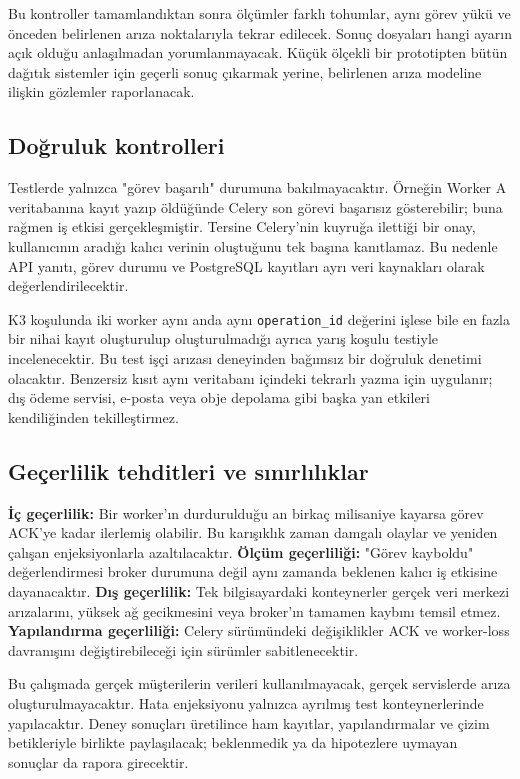 \documentclass[conference,a4paper]{IEEEtran}
\newcommand{\code}[1]{\texttt{#1}}
\begin{document}
Bu kontroller tamamlandıktan sonra ölçümler farklı tohumlar, aynı görev yükü ve önceden belirlenen arıza noktalarıyla tekrar edilecek. Sonuç dosyaları hangi ayarın açık olduğu anlaşılmadan yorumlanmayacak. Küçük ölçekli bir prototipten bütün dağıtık sistemler için geçerli sonuç çıkarmak yerine, belirlenen arıza modeline ilişkin gözlemler raporlanacak.

\subsection{Doğruluk kontrolleri}
Testlerde yalnızca "görev başarılı" durumuna bakılmayacaktır. Örneğin Worker A veritabanına kayıt yazıp öldüğünde Celery son görevi başarısız gösterebilir; buna rağmen iş etkisi gerçekleşmiştir. Tersine Celery'nin kuyruğa ilettiği bir onay, kullanıcının aradığı kalıcı verinin oluştuğunu tek başına kanıtlamaz. Bu nedenle API yanıtı, görev durumu ve PostgreSQL kayıtları ayrı veri kaynakları olarak değerlendirilecektir.

K3 koşulunda iki worker aynı anda aynı \code{operation\_id} değerini işlese bile en fazla bir nihai kayıt oluşturulup oluşturulmadığı ayrıca yarış koşulu testiyle incelenecektir. Bu test işçi arızası deneyinden bağımsız bir doğruluk denetimi olacaktır. Benzersiz kısıt aynı veritabanı içindeki tekrarlı yazma için uygulanır; dış ödeme servisi, e-posta veya obje depolama gibi başka yan etkileri kendiliğinden tekilleştirmez.

\subsection{Geçerlilik tehditleri ve sınırlılıklar}
\textbf{İç geçerlilik:} Bir worker'ın durdurulduğu an birkaç milisaniye kayarsa görev ACK'ye kadar ilerlemiş olabilir. Bu karışıklık zaman damgalı olaylar ve yeniden çalışan enjeksiyonlarla azaltılacaktır. \textbf{Ölçüm geçerliliği:} "Görev kayboldu" değerlendirmesi broker durumuna değil aynı zamanda beklenen kalıcı iş etkisine dayanacaktır. \textbf{Dış geçerlilik:} Tek bilgisayardaki konteynerler gerçek veri merkezi arızalarını, yüksek ağ gecikmesini veya broker'ın tamamen kaybını temsil etmez. \textbf{Yapılandırma geçerliliği:} Celery sürümündeki değişiklikler ACK ve worker-loss davranışını değiştirebileceği için sürümler sabitlenecektir.

Bu çalışmada gerçek müşterilerin verileri kullanılmayacak, gerçek servislerde arıza oluşturulmayacaktır. Hata enjeksiyonu yalnızca ayrılmış test konteynerlerinde yapılacaktır. Deney sonuçları üretilince ham kayıtlar, yapılandırmalar ve çizim betikleriyle birlikte paylaşılacak; beklenmedik ya da hipotezlere uymayan sonuçlar da rapora girecektir.
\end{document}
